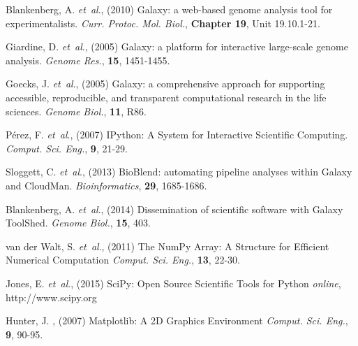 \documentclass{bioinfo}
\begin{document}
\begin{thebibliography}{}
Blankenberg, A. {\it et~al}., (2010) Galaxy: a web-based genome analysis tool for experimentalists. \textit{Curr. Protoc. Mol. Biol.},  {\bf Chapter 19}, Unit 19.10.1-21.

Giardine, D. {\it et~al}., (2005) Galaxy: a platform for interactive large-scale genome analysis. \textit{Genome Res.},  {\bf 15}, 1451-1455.

Goecks, J. {\it et~al}., (2005) Galaxy: a comprehensive approach for supporting accessible, reproducible, and transparent computational research in the life sciences. \textit{Genome Biol.},  {\bf 11}, R86.

P\'erez, F. {\it et~al}., (2007) IPython: A System for Interactive Scientific Computing. \textit{Comput. Sci. Eng.}, {\bf 9}, 21-29.

Sloggett, C. {\it et~al}., (2013) BioBlend: automating pipeline analyses within Galaxy and CloudMan. \textit{Bioinformatics}, {\bf 29}, 1685-1686.

Blankenberg, A. {\it et~al}., (2014) Dissemination of scientific software with Galaxy ToolShed. \textit{Genome Biol.}, {\bf 15}, 403.

van der Walt, S. {\it et~al}., (2011) The NumPy Array: A Structure for Efficient Numerical Computation \textit{Comput. Sci. Eng.}, {\bf 13}, 22-30.

Jones, E. {\it et~al}., (2015) SciPy: Open Source Scientific Tools for Python  \textit{online}, http://www.scipy.org

Hunter, J. , (2007) Matplotlib: A 2D Graphics Environment \textit{Comput. Sci. Eng.}, {\bf 9}, 90-95.



\end{thebibliography}
\end{document}
